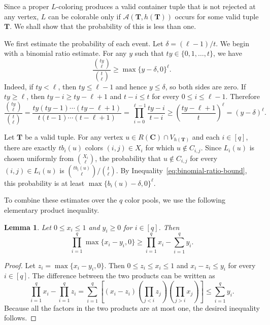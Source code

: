 \documentclass[12pt]{article}
\numberwithin{equation}{section}
\newtheorem{lemma}[theorem]{Lemma}
\theoremstyle{definition}
\begin{document}
Since a proper $L$-coloring produces a valid container tuple that is not
rejected at any vertex, $L$ can be colorable only if
$\mathcal A(\mathbf T,h(\mathbf T))$ occurs for some valid tuple $\mathbf T$.
We shall show that the probability of this is less than one.

We first estimate the probability of each event. Let $\delta = (\ell - 1)/t$.
We begin with a binomial ratio estimate. For any $y$ such that
$ty \in \{0,1,\ldots,t\}$, we have
\begin{equation}\label{eq:binomial-ratio-bound}
 \frac{\binom{ty}{\ell}}{\binom{t}{\ell}}
 \geq \max\{y - \delta,0\}^{\ell}.
\end{equation}
Indeed, if $ty < \ell$, then $ty \leq \ell - 1$ and hence $y \leq \delta$, so both
sides are zero. If $ty \geq \ell$, then $ty-i\geq ty-\ell+1$ and
$t-i\leq t$ for every $0\leq i\leq\ell-1$. Therefore
\[
 \frac{\binom{ty}{\ell}}{\binom{t}{\ell}}
 = \frac{ty(ty-1)\cdots(ty-\ell+1)}
 {t(t-1)\cdots(t-\ell+1)}
 = \prod_{i = 0}^{\ell - 1}\frac{ty - i}{t - i}
 \geq \left(\frac{ty - \ell + 1}{t}\right)^{\ell}
 = (y - \delta)^{\ell}.
\]

Let $\mathbf T$ be a valid tuple. For any vertex
$u\in R(\mathbf{C})\cap V_{h(\mathbf T)}$ and each $i \in [q]$, there are
exactly $tb_i(u)$
colors $(i,j)\in X_i$ for which $u \notin C_{i,j}$. Since $L_i(u)$ is chosen
uniformly from $\binom{X_i}{\ell}$, the probability that
$u \notin C_{i,j}$ for every $(i,j)\in L_i(u)$ is
$\binom{tb_i(u)}{\ell}/\binom{t}{\ell}$. By
Inequality~\eqref{eq:binomial-ratio-bound}, this probability is at least
$\max\{b_i(u) - \delta,0\}^{\ell}$.

To combine these estimates over the $q$ color pools, we use the following
elementary product inequality.

\begin{lemma}\label{lem:product-estimate}
Let $0 \leq x_i \leq 1$ and $y_i \geq 0$ for $i \in [q]$. Then
\[
 \prod_{i = 1}^q \max\{x_i - y_i,0\}
 \geq
 \prod_{i = 1}^q x_i - \sum_{i = 1}^q y_i.
\]
\end{lemma}

\begin{proof}
Let $z_i=\max\{x_i-y_i,0\}$. Then $0\leq z_i\leq x_i\leq1$ and
$x_i-z_i\leq y_i$ for every $i\in[q]$. The difference between the two
products can be written as
\[
 \prod_{i=1}^q x_i-\prod_{i=1}^q z_i
 =\sum_{i=1}^q \left[(x_i-z_i)
   \left(\prod_{j<i}z_j \right) \left(\prod_{j>i}x_j \right) \right]
 \leq\sum_{i=1}^q y_i.
\]
Because all the factors in the two products are at most one, the desired
inequality follows.
\end{proof}
\end{document}
